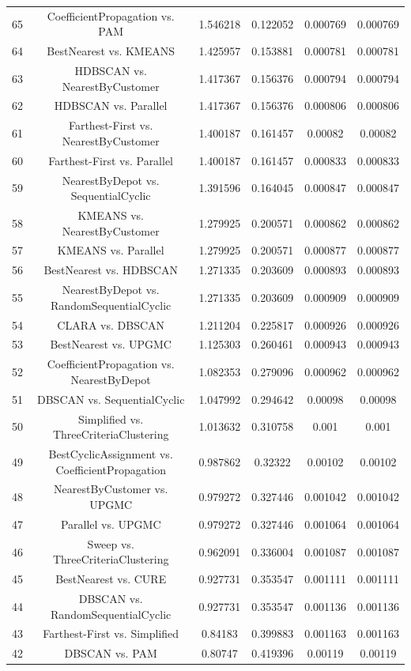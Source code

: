 \documentclass[a4paper,10pt]{article}
\begin{document}
\begin{landscape}
\begin{table}[!htp]
\begin{tabular}{cccccc}
65&CoefficientPropagation vs. PAM&1.546218&0.122052&0.000769&0.000769\\
64&BestNearest vs. KMEANS&1.425957&0.153881&0.000781&0.000781\\
63&HDBSCAN vs. NearestByCustomer&1.417367&0.156376&0.000794&0.000794\\
62&HDBSCAN vs. Parallel&1.417367&0.156376&0.000806&0.000806\\
61&Farthest-First vs. NearestByCustomer&1.400187&0.161457&0.00082&0.00082\\
60&Farthest-First vs. Parallel&1.400187&0.161457&0.000833&0.000833\\
59&NearestByDepot vs. SequentialCyclic&1.391596&0.164045&0.000847&0.000847\\
58&KMEANS vs. NearestByCustomer&1.279925&0.200571&0.000862&0.000862\\
57&KMEANS vs. Parallel&1.279925&0.200571&0.000877&0.000877\\
56&BestNearest vs. HDBSCAN&1.271335&0.203609&0.000893&0.000893\\
55&NearestByDepot vs. RandomSequentialCyclic&1.271335&0.203609&0.000909&0.000909\\
54&CLARA vs. DBSCAN&1.211204&0.225817&0.000926&0.000926\\
53&BestNearest vs. UPGMC&1.125303&0.260461&0.000943&0.000943\\
52&CoefficientPropagation vs. NearestByDepot&1.082353&0.279096&0.000962&0.000962\\
51&DBSCAN vs. SequentialCyclic&1.047992&0.294642&0.00098&0.00098\\
50&Simplified vs. ThreeCriteriaClustering&1.013632&0.310758&0.001&0.001\\
49&BestCyclicAssignment vs. CoefficientPropagation&0.987862&0.32322&0.00102&0.00102\\
48&NearestByCustomer vs. UPGMC&0.979272&0.327446&0.001042&0.001042\\
47&Parallel vs. UPGMC&0.979272&0.327446&0.001064&0.001064\\
46&Sweep vs. ThreeCriteriaClustering&0.962091&0.336004&0.001087&0.001087\\
45&BestNearest vs. CURE&0.927731&0.353547&0.001111&0.001111\\
44&DBSCAN vs. RandomSequentialCyclic&0.927731&0.353547&0.001136&0.001136\\
43&Farthest-First vs. Simplified&0.84183&0.399883&0.001163&0.001163\\
42&DBSCAN vs. PAM&0.80747&0.419396&0.00119&0.00119\\

\end{tabular}
\end{table}
\end{landscape}
\end{document}
